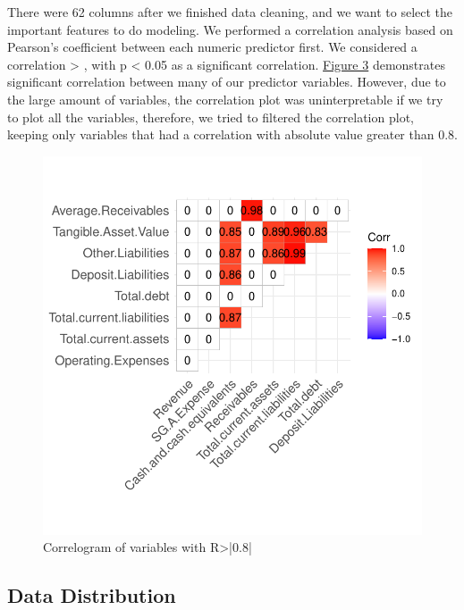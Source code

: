 \documentclass[11pt,]{article}
\begin{document}
There were 62 columns after we finished data cleaning, and we want to
select the important features to do modeling. We performed a correlation
analysis based on Pearson's coefficient between each numeric predictor
first. We considered a correlation \textgreater{} \textbar,
with p \textless{} 0.05 as a significant correlation.
\hyperref[sec:fig3]{Figure 3} demonstrates significant correlation
between many of our predictor variables. However, due to the large
amount of variables, the correlation plot was uninterpretable if we try
to plot all the variables, therefore, we tried to filtered the
correlation plot, keeping only variables that had a correlation with
absolute value greater than 0.8.

\begin{figure}

{\centering \includegraphics{stock_analysis_files/figure-latex/corrplot-1} 

}

\caption{Correlogram of variables with R>|0.8|}\label{fig:corrplot}
\end{figure}

\hypertarget{data-distribution}{%
\subsection{Data Distribution}\label{data-distribution}}
\end{document}
